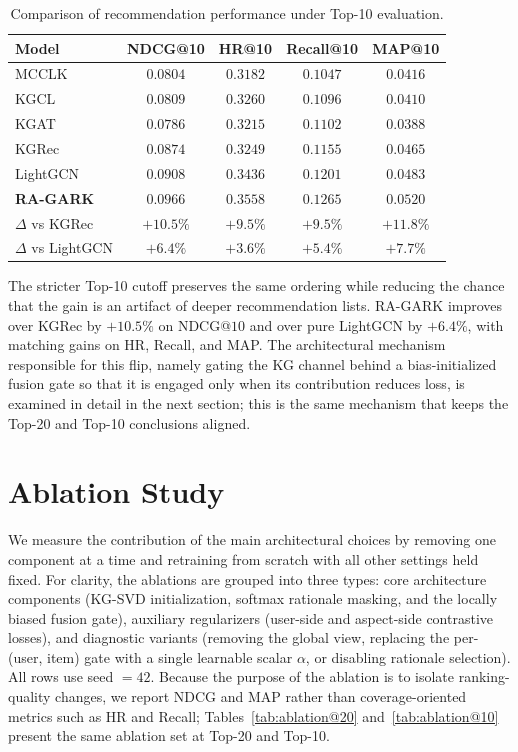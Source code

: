 \begin{table}[H]
\centering
\caption{Comparison of recommendation performance under Top-10 evaluation.}
\label{tab:main@10}
\begin{tabular}{lcccc}
\toprule
Model & NDCG@10 & HR@10 & Recall@10 & MAP@10 \\
\midrule
MCCLK~\cite{zou2022mcclk}   & $0.0804$ & $0.3182$ & $0.1047$ & $0.0416$ \\
KGCL~\cite{yang2022kgcl}    & $0.0809$ & $0.3260$ & $0.1096$ & $0.0410$ \\
KGAT~\cite{wang2019kgat}    & $0.0786$ & $0.3215$ & $0.1102$ & $0.0388$ \\
KGRec~\cite{yang2023kgrec}  & $0.0874$ & $0.3249$ & $0.1155$ & $0.0465$ \\
LightGCN~\cite{he2020lightgcn} & $0.0908$ & $0.3436$ & $0.1201$ & $0.0483$ \\
\midrule
\textbf{RA-GARK}     & $\mathbf{0.0966}$ & $\mathbf{0.3558}$ & $\mathbf{0.1265}$ & $\mathbf{0.0520}$ \\
\midrule
$\Delta$ vs KGRec            & $+10.5\%$ & $+9.5\%$  & $+9.5\%$  & $+11.8\%$ \\
$\Delta$ vs LightGCN         & $+6.4\%$  & $+3.6\%$  & $+5.4\%$  & $+7.7\%$  \\
\bottomrule
\end{tabular}
\end{table}
\FloatBarrier

The stricter Top-10 cutoff preserves the same ordering while reducing the chance that the gain is an artifact of deeper recommendation lists. RA-GARK improves over KGRec by $+10.5\%$ on NDCG@$10$ and over pure LightGCN by $+6.4\%$, with matching gains on HR, Recall, and MAP. The architectural mechanism responsible for this flip, namely gating the KG channel behind a bias-initialized fusion gate so that it is engaged only when its contribution reduces loss, is examined in detail in the next section; this is the same mechanism that keeps the Top-20 and Top-10 conclusions aligned.

\section{Ablation Study}
\label{sec:eval-ablation}
\label{sec:ablation-svd}
\label{sec:ablation-softmax}
\label{sec:ablation-gate}

We measure the contribution of the main architectural choices by removing one component at a time and retraining from scratch with all other settings held fixed. For clarity, the ablations are grouped into three types: core architecture components (KG-SVD initialization, softmax rationale masking, and the locally biased fusion gate), auxiliary regularizers (user-side and aspect-side contrastive losses), and diagnostic variants (removing the global view, replacing the per-(user, item) gate with a single learnable scalar $\alpha$, or disabling rationale selection). All rows use seed $= 42$. Because the purpose of the ablation is to isolate ranking-quality changes, we report NDCG and MAP rather than coverage-oriented metrics such as HR and Recall; Tables~\ref{tab:ablation@20} and~\ref{tab:ablation@10} present the same ablation set at Top-20 and Top-10.

